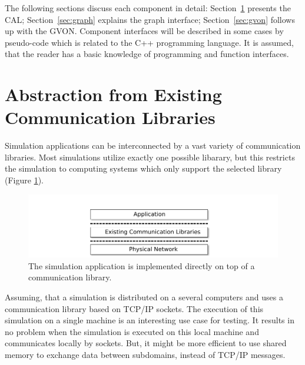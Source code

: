 The following sections discuss each component in detail:
Section~\ref{sec:comm_abstraction} presents the CAL;
Section~\ref{sec:graph} explains the graph interface;
Section~\ref{sec:gvon} follows up with the GVON.  Component interfaces
will be described in some cases by pseudo-code which is related to the
C++ programming language. It is assumed, that the reader has a basic
knowledge of programming and function interfaces.

\section{Abstraction from Existing Communication Libraries}
\label{sec:comm_abstraction}

Simulation applications can be interconnected by a vast variety of
communication libraries. Most simulations utilize exactly one possible
libarary, but this restricts the simulation to computing systems which
only support the selected library (Figure
\ref{fig:design_state_of_the_art}).

\begin{figure}[H]
  \centering \includegraphics[width=\textwidth]{graphics/30_design_state_of_the_art}
  \caption{The simulation application is implemented directly on top
    of a communication library.}
  \label{fig:design_state_of_the_art}
\end{figure}

Assuming, that a simulation is distributed on a several computers and uses a
communication library based on TCP/IP sockets. The execution of this
simulation on a single machine is an interesting use case for
testing. It results in no problem when the simulation is executed on
this local machine and communicates locally by sockets.  But, it might
be more efficient to use shared memory to exchange data between
subdomains, instead of TCP/IP messages.

